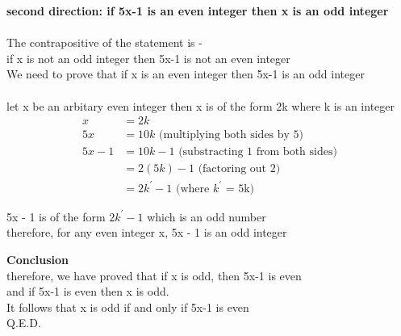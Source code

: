 \documentclass[11pt]{article}
\begin{document}
{{{\noindent
\textbf{second direction: if 5x-1 is an even integer then x is an odd integer} \\
\\
The contrapositive of the statement is - \\
if x is not an odd integer then 5x-1 is not an even integer \\
We need to prove that
if x is an even integer then 5x-1 is an odd integer \\
\\
let x be an arbitary even integer then x is of the form 2k
where k is an integer \\
\begin{align*}
    x &= 2k \\
    5x &= 10k \text{  (multiplying both sides by 5)} \\
    5x - 1 &= 10k - 1 \text{  (substracting 1 from both sides)}  \\
    &= 2(5k)  - 1 \text{  (factoring out 2)} \\
    &= 2k^{\prime} - 1 \text{  (where $k^{\prime}$ = 5k)}
\end{align*}

\noindent
5x - 1 is of the form $2k^{\prime} - 1$ which is an odd number \\
therefore, for any even integer x, 5x - 1 is an odd integer

\noindent
\textbf{Conclusion} \\
therefore, we have proved that if x is odd, then 5x-1 is even \\
and if 5x-1 is even then x is odd. \\
It follows that x is odd if and only if 5x-1 is even \\
Q.E.D.

}}}
\end{document}
